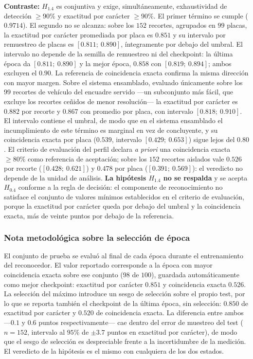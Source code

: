 \textbf{Contraste:} $H_{1{.}4}$ es conjuntiva y exige, simultáneamente,
exhaustividad de detección $\geq 90\%$ y exactitud por carácter $\geq 90\%$. El
primer término se cumple ($0{.}9714$). El segundo no se alcanza: sobre los $152$
recortes, agrupados en $99$ placas, la exactitud por carácter promediada por placa
es $0{.}851$ y su intervalo por remuestreo de placas es $[0{.}811;\ 0{.}890]$,
íntegramente por debajo del umbral. El intervalo no depende de la semilla de
remuestreo ni del checkpoint: la última época da $[0{.}811;\ 0{.}890]$ y la mejor
época, $0{.}858$ con $[0{.}819;\ 0{.}894]$; ambos excluyen el $0{.}90$. La
referencia de coincidencia exacta confirma la misma dirección con mayor margen.
Sobre el sistema
ensamblado, evaluado únicamente sobre los
$99$ recortes de vehículo del encuadre servido ---un subconjunto más fácil, que
excluye los recortes ceñidos de menor resolución--- la exactitud por carácter es
$0{.}882$ por recorte y $0{.}867$ con promedio por placa, con intervalo
$[0{.}818;\ 0{.}910]$. El intervalo contiene el umbral, de modo que en el sistema
ensamblado el incumplimiento de este término es marginal en vez de concluyente, y
su coincidencia exacta por placa ($0{.}539$, intervalo $[0{.}429;\ 0{.}653]$)
sigue lejos del $0{.}80$. El criterio de evaluación del perfil declara
\emph{a priori} una coincidencia exacta $\geq 80\%$ como referencia de aceptación;
sobre los $152$ recortes aislados vale $0{.}526$ por recorte
($[0{.}428;\ 0{.}621]$) y $0{.}478$ por placa ($[0{.}391;\ 0{.}569]$): el
veredicto no depende de la unidad de análisis. \textbf{La hipótesis
$H_{1{.}4}$ no se respalda} y se acepta $H_{0{.}4}$ conforme a la regla de decisión: el
componente de reconocimiento no satisface el conjunto de valores mínimos
establecidos en el criterio de evaluación, porque la exactitud por carácter queda
por debajo del umbral y la coincidencia exacta, más de veinte puntos por debajo de
la referencia.

\subsubsection{Nota metodológica sobre la selección de época}

El conjunto de prueba se evaluó al final de cada época durante el entrenamiento
del reconocedor. El valor reportado corresponde a la época con mayor coincidencia
exacta sobre ese conjunto ($98$ de $100$), guardada automáticamente como mejor
checkpoint: exactitud por carácter $0{.}851$ y coincidencia exacta $0{.}526$. La
selección del máximo introduce un sesgo de selección sobre el propio test, por lo
que se reporta también el checkpoint de la última época, sin selección: $0{.}850$
de exactitud por carácter y $0{.}520$ de coincidencia exacta. La diferencia entre
ambos ---$0{.}1$ y $0{.}6$ puntos respectivamente--- cae dentro del error de
muestreo del test ($n = 152$, intervalo al $95\%$ de $\pm 3{.}7$ puntos en
exactitud por carácter), de modo que el sesgo de selección es despreciable frente
a la incertidumbre de la medición. El veredicto de la hipótesis es el mismo con
cualquiera de los dos estados.

